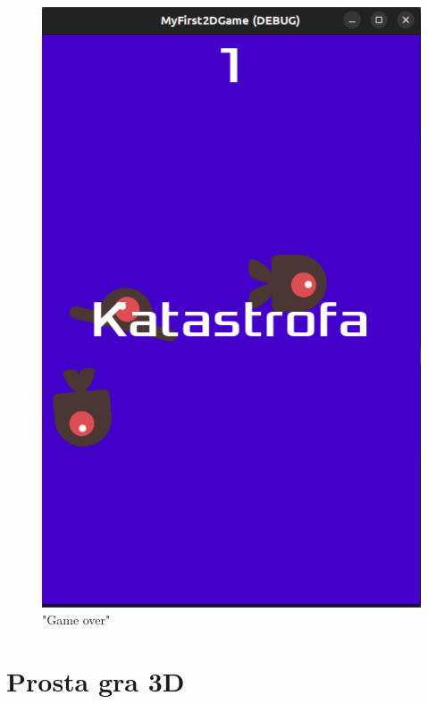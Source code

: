\documentclass[a4paper]{article}
\begin{document}
\begin{sloppypar}
\begin{center}
\begin{figure}
			\includegraphics[height=0.35\textheight]{game_over.png}
			\caption{"Game over"}
		\end{figure}
	\end{center}
	\clearpage
	\section[htb]{Prosta gra 3D}
\end{sloppypar}
\end{document}
